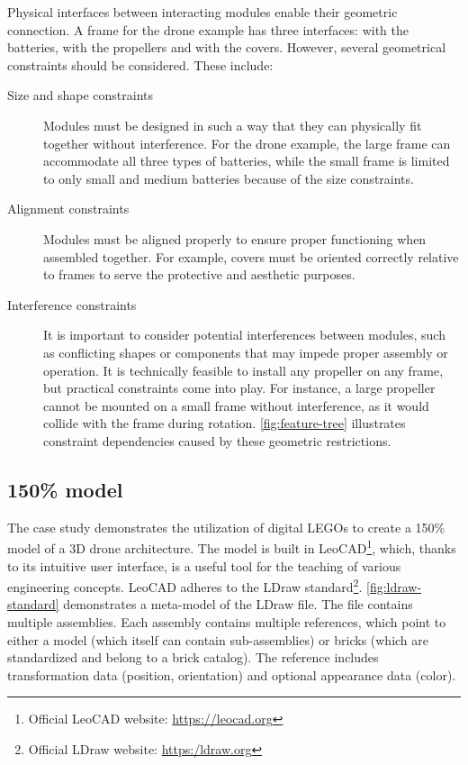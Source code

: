 \documentclass[sigconf,review]{acmart}
\begin{document}
Physical interfaces between interacting modules enable their geometric connection. 
A frame for the drone example has three interfaces: with the batteries, with the propellers and with the covers. 
However, several geometrical constraints should be considered. These include:

\begin{description}
    \item[Size and shape constraints] Modules must be designed in such a way that they can physically fit together without interference. 
For the drone example, the large frame can accommodate all three types of batteries, while the small frame is limited to only small and medium batteries because of the size constraints.
    \item[Alignment constraints] Modules must be aligned properly to ensure proper functioning when assembled together. 
For example, covers must be oriented correctly relative to frames to serve the protective and aesthetic purposes. 
    \item[Interference constraints] It is important to consider potential interferences between modules, such as conflicting shapes or components that may impede proper assembly or operation. 
It is technically feasible to install any propeller on any frame, but practical constraints come into play. 
For instance, a large propeller cannot be mounted on a small frame without interference, as it would collide with the frame during rotation.
\cref{fig:feature-tree} illustrates constraint dependencies caused by these geometric restrictions.
\end{description}

\subsection{150\% model}
\label{sec:150-model}

The case study demonstrates the utilization of digital LEGOs to create a 150\% model of a 3D drone architecture. 
The model is built in LeoCAD\footnote{Official LeoCAD website: \url{https://leocad.org}}, which, thanks to its intuitive user interface, is a useful tool for the teaching of various engineering concepts. 
LeoCAD adheres to the LDraw standard\footnote{Official LDraw website: \url{https:/ldraw.org}}. 
\cref{fig:ldraw-standard} demonstrates a meta-model of the LDraw file. The file contains multiple assemblies. 
Each assembly contains multiple references, which point to either a model (which itself can contain sub-assemblies) or bricks (which are standardized and belong to a brick catalog). 
The reference includes transformation data (position, orientation) and optional appearance data (color).
\end{document}
